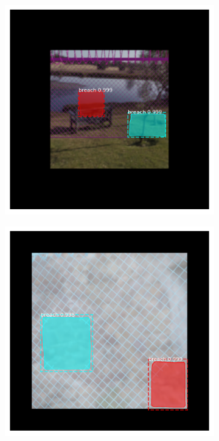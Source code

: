 \documentclass[../Head/Main.tex]{subfiles}
\begin{document}
\begin{figure}[H]
\begin{subfigure}{.23\textwidth}
        \caption{}
        \label{fig:mask_rcnn_instance_hard}
    \end{subfigure}
    \hfill
    \begin{subfigure}{.23\textwidth}
        \centering
        \includegraphics[width=\textwidth]{../Figures/rcnn_results/found_breaches/mask/2.png}
        \caption{}
    \end{subfigure}
    \hfill
    \begin{subfigure}{.23\textwidth}
        \centering
        \includegraphics[width=\textwidth]{../Figures/rcnn_results/found_breaches/mask/3.png}

\end{subfigure}
\end{figure}
\end{document}
